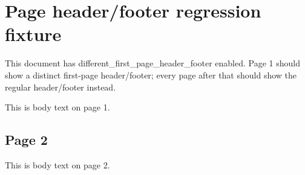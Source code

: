 \documentclass[11pt,a4paper]{article}
\begin{document}
\section{Page header/footer regression fixture}

This document has different\_first\_page\_header\_footer enabled. Page 1 should show a distinct first-page header/footer; every page after that should show the regular header/footer instead.

This is body text on page 1.

\subsection{Page 2}

This is body text on page 2.
\end{document}
